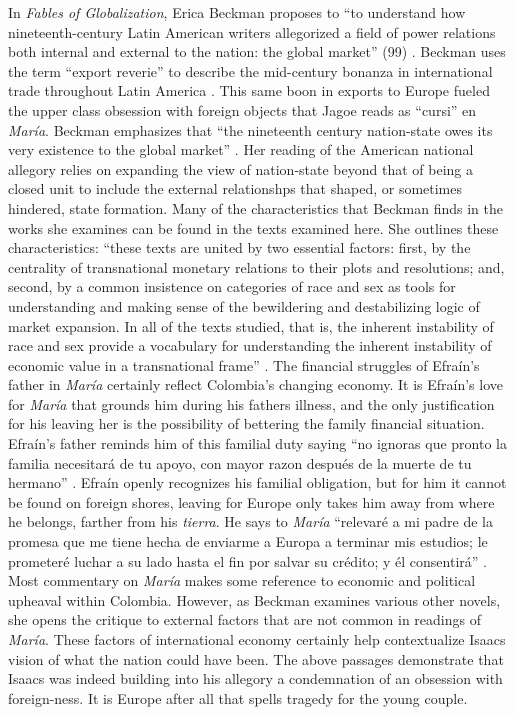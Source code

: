 In \textit{Fables of Globalization}, Erica Beckman proposes to \enquote{to understand how nineteenth-century Latin American writers allegorized a field of power relations both internal and external to the nation: the global market} (99) \nocite{Beckman2013}. 
Beckman uses the term \enquote{export reverie} to describe the mid-century bonanza in international trade throughout Latin America \autocite[x]{Beckman2012}.
This same boon in exports to Europe fueled the upper class obsession with foreign objects that Jagoe reads as \enquote{cursi} en \textit{María}.
Beckman emphasizes that \enquote{the nineteenth century nation-state owes its very existence to the global market} \autocite[100]{Beckman2013}.
Her reading of the American national allegory relies on expanding the view of nation-state beyond that of being a closed unit to include the external relationshps that shaped, or sometimes hindered, state formation.
Many of the characteristics that Beckman finds in the works she examines can be found in the texts examined here.
She outlines these characteristics: \enquote{these texts are united by two essential factors: first, by the centrality of transnational monetary relations to their plots and resolutions; and, second, by a common insistence on categories of race and sex as tools for understanding and making sense of the bewildering and destabilizing logic of market expansion. In all of the texts studied, that is, the inherent instability of race and sex provide a vocabulary for understanding the inherent instability of economic value in a transnational frame} \autocite[101]{Beckman2013}.
The financial struggles of Efraín's father in \textit{María} certainly reflect Colombia's changing economy.
It is Efraín's love for \textit{María} that grounds him during his fathers illness, and the only justification for his leaving her is the possibility of bettering the family financial situation.
Efraín's father reminds him of this familial duty saying \enquote{no ignoras que pronto la familia necesitará de tu apoyo, con mayor razon después de la muerte de tu hermano} \autocite[??]{Isaacs2012}.
Efraín openly recognizes his familial obligation, but for him it cannot be found on foreign shores, leaving for Europe only takes him away from where he belongs, farther from his \textit{tierra}.
He says to \textit{María} \enquote{relevaré a mi padre de la promesa que me tiene hecha de enviarme a Europa a terminar mis estudios; le prometeré luchar a su lado hasta el fin por salvar su crédito; y él consentirá} \autocite[]{Isaacs2012}.
Most commentary on \textit{María} makes some reference to economic and political upheaval within Colombia.
However, as Beckman examines various other novels, she opens the critique to external factors that are not common in readings of \textit{María}.
These factors of international economy certainly help contextualize Isaacs vision of what the nation could have been.
The above passages demonstrate that Isaacs was indeed building into his allegory a condemnation of an obsession with foreign-ness.
It is Europe after all that spells tragedy for the young couple.

